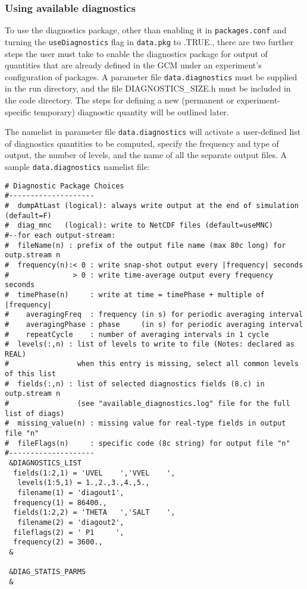\subsubsection{Using available diagnostics}
\noindent
To use the diagnostics package, other than enabling it in {\tt packages.conf}
and turning the {\tt useDiagnostics} flag in {\tt data.pkg} to .TRUE., there are two
further steps the user must take to enable the diagnostics package for
output of quantities that are already defined in the GCM under an experiment's
configuration of packages.
A parameter file {\tt data.diagnostics} must be supplied in the run directory,
and the file DIAGNOSTICS\_SIZE.h must be included in the
code directory.  The steps for defining a new (permanent or experiment-specific
temporary) diagnostic quantity will be outlined later.

\noindent The namelist in parameter file {\tt data.diagnostics} will activate
a user-defined list of diagnostics quantities to be computed,
specify the frequency and type of output, the number of levels, and
the name of all the separate output files.
A sample {\tt data.diagnostics} namelist file:

\begin{verbatim}
# Diagnostic Package Choices
#--------------------
#  dumpAtLast (logical): always write output at the end of simulation (default=F)
#  diag_mnc   (logical): write to NetCDF files (default=useMNC)
#--for each output-stream:
#  fileName(n) : prefix of the output file name (max 80c long) for outp.stream n
#  frequency(n):< 0 : write snap-shot output every |frequency| seconds
#               > 0 : write time-average output every frequency seconds
#  timePhase(n)     : write at time = timePhase + multiple of |frequency|
#    averagingFreq  : frequency (in s) for periodic averaging interval
#    averagingPhase : phase     (in s) for periodic averaging interval
#    repeatCycle    : number of averaging intervals in 1 cycle
#  levels(:,n) : list of levels to write to file (Notes: declared as REAL)
#                when this entry is missing, select all common levels of this list
#  fields(:,n) : list of selected diagnostics fields (8.c) in outp.stream n
#                (see "available_diagnostics.log" file for the full list of diags)
#  missing_value(n) : missing value for real-type fields in output file "n"
#  fileFlags(n)     : specific code (8c string) for output file "n"
#--------------------
 &DIAGNOSTICS_LIST
  fields(1:2,1) = 'UVEL    ','VVEL    ',
   levels(1:5,1) = 1.,2.,3.,4.,5.,
   filename(1) = 'diagout1',
  frequency(1) = 86400.,
  fields(1:2,2) = 'THETA   ','SALT    ',
   filename(2) = 'diagout2',
  fileflags(2) = ' P1     ',
  frequency(2) = 3600.,
 &

 &DIAG_STATIS_PARMS
 &
\end{verbatim}

